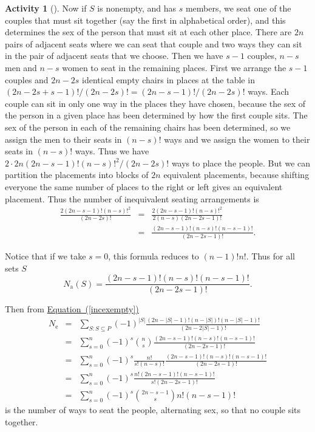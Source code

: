 \documentclass[10pt,]{book}
\theoremstyle{plain}
\theoremstyle{definition}
\newtheorem{activity}[project]{Activity}
\numberwithin{equation}{chapter}
\newcommand{\amp}{&}
\begin{document}
\begin{activity}[]
Now if \(S\) is nonempty, and has \(s\) members, we seat one of the couples that must sit together (say the first in alphabetical order), and this determines the sex of the person that must sit at each other place. There are \(2n\) pairs of adjacent seats where we can seat that couple and two ways they can sit in the pair of adjacent seats that we choose. Then we have \(s-1\) couples, \(n-s\) men and \(n-s\) women to seat in the remaining places. First we arrange the \(s-1\) couples and \(2n-2s\) identical empty chairs in places at the table in \((2n-2s+s-1)!/(2n-2s)!=(2n-s-1)!/(2n-2s)!\) ways. Each couple can sit in only one way in the places they have chosen, because the sex of the person in a given place has been determined by how the first couple sits. The sex of the person in each of the remaining chairs has been determined, so we assign the men to their seats in \((n-s)!\) ways and we assign the women to their seats in \((n-s)!\) ways. Thus we have \(2\cdot2n(2n-s-1)!(n-s)!^2/(2n-2s)!\) ways to place the people. But we can partition the placements into blocks of \(2n\) equivalent placements, because shifting everyone the same number of places to the right or left gives an equivalent placement. Thus the number of inequivalent seating arrangements is%
\begin{align*}
\frac{2(2n-s-1)!(n-s)!^2}{(2n-2s)!}\amp =\amp \frac{2(2n-s-1)!(n-s)!^2}{2(n-s)(2n-2s-1)!}\\
\amp =\amp \frac{(2n-s-1)!(n-s)!(n-s-1)!}{(2n-2s-1)!}.
\end{align*}
%
\par
Notice that if we take \(s=0\), this formula reduces to \((n-1)!n!\). Thus for all sets \(S\)%
\begin{equation*}
N_{\mbox{a} }(S)=\frac{(2n-s-1)!(n-s)!(n-s-1)!}{(2n-2s-1)!}.
\end{equation*}
%
\par
Then from \hyperref[incexempty]{Equation~(\ref{incexempty})}%
\begin{align*}
N_{\mbox{e} } \amp =\amp  \sum_{S:S\subseteq P} (-1)^{|S|}\frac{(2n-|S|-1)!(n-|S|)!(n-|S|-1)!
}{(2n-2|S|-1)!}\\
\amp =\amp \sum_{s=0}^n(-1)^s\binom{n}{s}\frac{(2n-s-1)!(n-s)!(n-s-1)!}{(2n-2s-1)!}\\
\amp =\amp \sum_{s=0}^n(-1)^s\frac{n!}{s!(n-s)!}\frac{(2n-s-1)!(n-s)!(n-s-1)!}{(2n-2s-1)!}\\
\amp =\amp \sum_{s=0}^n(-1)^s \frac{n!(2n-s-1)!(n-s-1)!}{s!(2n-2s-1)!}\\
\amp =\amp \sum_{s=0}^n(-1)^s\binom{2n-s-1}{s}n!(n-s-1)!
\end{align*}
is the number of ways to seat the people, alternating sex, so that no couple sits together.%
\end{activity}
\typeout{************************************************}
\typeout{************************************************}
\end{document}
